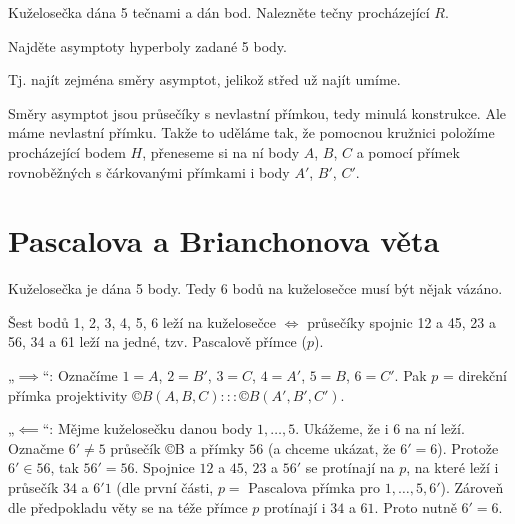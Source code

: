 \documentclass[12pt]{article}					%
\begin{document}
\begin{priklad}
	Kuželosečka dána 5 tečnami a dán bod. Nalezněte tečny procházející $R$.
\end{priklad}

\begin{priklad}
	Najděte asymptoty hyperboly zadané 5 body.

	\begin{poznamkain}
		Tj. najít zejména směry asymptot, jelikož střed už najít umíme.
	\end{poznamkain}

	\begin{reseni}
		Směry asymptot jsou průsečíky s nevlastní přímkou, tedy minulá konstrukce. Ale máme nevlastní přímku. Takže to uděláme tak, že pomocnou kružnici položíme procházející bodem $H$, přeneseme si na ní body $A$, $B$, $C$ a pomocí přímek rovnoběžných s čárkovanými přímkami i body $A'$, $B'$, $C'$.
	\end{reseni}
\end{priklad}


\section{Pascalova a Brianchonova věta}
\begin{poznamka}[Idea]
	Kuželosečka je dána 5 body. Tedy 6 bodů na kuželosečce musí být nějak vázáno.
\end{poznamka}

\begin{veta}[Pascalova]
	Šest bodů 1, 2, 3, 4, 5, 6 leží na kuželosečce $\Leftrightarrow$ průsečíky spojnic 12 a 45, 23 a 56, 34 a 61 leží na jedné, tzv. Pascalově přímce ($p$).

	\begin{dukazin}
		„$\implies$“: Označíme $1 = A$, $2 = B'$, $3 = C$, $4 = A'$, $5 = B$, $6 = C'$. Pak $p$ = direkční přímka projektivity $©B(A, B, C) ::: ©B(A', B', C')$.

		„$\impliedby$“: Mějme kuželosečku danou body $1, …, 5$. Ukážeme, že i $6$ na ní leží. Označme $6' ≠ 5$ průsečík ©B a přímky $56$ (a chceme ukázat, že $6' = 6$). Protože $6' \in 56$, tak $56' = 56$. Spojnice $12$ a $45$, $23$ a $56'$ se protínají na $p$, na které leží i průsečík $34$ a $6'1$ (dle první části, $p = $ Pascalova přímka pro $1, …, 5, 6'$). Zároveň dle předpokladu věty se na téže přímce $p$ protínají i $34$ a $61$. Proto nutně $6' = 6$.
	\end{dukazin}
\end{veta}
\end{document}
